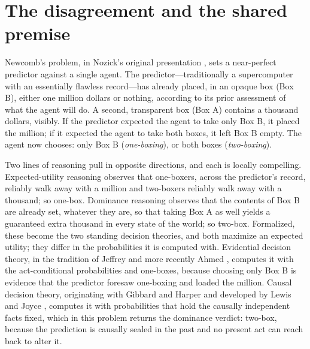 \section{The disagreement and the shared premise}
\label{sec:disagreement}

Newcomb's problem, in Nozick's original presentation \cite{nozick1969newcomb}, sets a near-perfect predictor against a single agent. The predictor---traditionally a supercomputer with an essentially flawless record---has already placed, in an opaque box (Box B), either one million dollars or nothing, according to its prior assessment of what the agent will do. A second, transparent box (Box A) contains a thousand dollars, visibly. If the predictor expected the agent to take only Box B, it placed the million; if it expected the agent to take both boxes, it left Box B empty. The agent now chooses: only Box B (\emph{one-boxing}), or both boxes (\emph{two-boxing}).

Two lines of reasoning pull in opposite directions, and each is locally compelling. Expected-utility reasoning observes that one-boxers, across the predictor's record, reliably walk away with a million and two-boxers reliably walk away with a thousand; so one-box. Dominance reasoning observes that the contents of Box B are already set, whatever they are, so that taking Box A as well yields a guaranteed extra thousand in every state of the world; so two-box. Formalized, these become the two standing decision theories, and both maximize an expected utility; they differ in the probabilities it is computed with. Evidential decision theory, in the tradition of Jeffrey \cite{jeffrey1983logic} and more recently Ahmed \cite{ahmed2014evidence}, computes it with the act-conditional probabilities and one-boxes, because choosing only Box B is evidence that the predictor foresaw one-boxing and loaded the million. Causal decision theory, originating with Gibbard and Harper \cite{gibbard1978counterfactual} and developed by Lewis \cite{lewis1981causal} and Joyce \cite{joyce1999foundations}, computes it with probabilities that hold the causally independent facts fixed, which in this problem returns the dominance verdict: two-box, because the prediction is causally sealed in the past and no present act can reach back to alter it.

